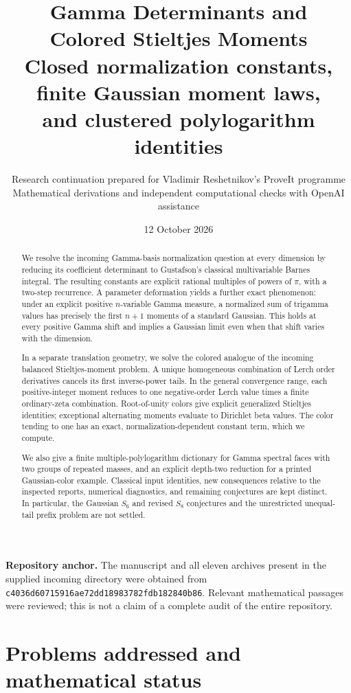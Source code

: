 \documentclass[11pt,a4paper]{article}
\title{\textbf{Gamma Determinants and\\Colored Stieltjes Moments}\\[7pt]
 \large Closed normalization constants, finite Gaussian moment laws,\\
 and clustered polylogarithm identities}
\author{Research continuation prepared for Vladimir Reshetnikov's ProveIt programme\\
 \small Mathematical derivations and independent computational checks with OpenAI assistance}
\date{12 October 2026}
\numberwithin{equation}{section}
\theoremstyle{definition}
\theoremstyle{remark}
\newcommand{\src}[1]{\nolinkurl{#1}}
\newcommand{\pin}{\src{c4036d60715916ae72dd18983782fdb182840b86}}
\begin{document}
\maketitle
\begin{abstract}
We resolve the incoming Gamma-basis normalization question at every
dimension by reducing its coefficient determinant to Gustafson's
classical multivariable Barnes integral. The resulting constants are
explicit rational multiples of powers of $\pi$, with a two-step
recurrence. A parameter deformation yields a further exact phenomenon:
under an explicit positive $n$-variable Gamma measure, a normalized sum
of trigamma values has precisely the first $n+1$ moments of a standard
Gaussian. This holds at every positive Gamma shift and implies a
Gaussian limit even when that shift varies with the dimension.

In a separate translation geometry, we solve the colored analogue of
the incoming balanced Stieltjes-moment problem. A unique homogeneous
combination of Lerch order derivatives cancels its first inverse-power
tails. In the general convergence range, each positive-integer moment reduces to one
negative-order Lerch value times a finite ordinary-zeta combination.
Root-of-unity colors give explicit generalized Stieltjes identities;
exceptional alternating moments evaluate to Dirichlet beta values.
The color tending to one has an exact, normalization-dependent
constant term, which we compute.

We also give a finite multiple-polylogarithm dictionary for Gamma
spectral faces with two groups of repeated masses, and an explicit
depth-two reduction for a printed Gaussian-color example.
Classical input identities, new consequences relative to the inspected
reports, numerical diagnostics, and remaining conjectures are kept
distinct. In particular, the Gaussian $S_6$ and revised $S_8$ conjectures
and the unrestricted unequal-tail prefix problem are not settled.
\end{abstract}
\vfill
{\noindent\small\textbf{Repository anchor.} The manuscript and all eleven
archives present in the supplied incoming directory were obtained from
\pin. Relevant mathematical passages were reviewed; this is not a
claim of a complete audit of the entire repository.\par}
\clearpage
{\small\tableofcontents}
\clearpage
\section{Problems addressed and mathematical status}
\label{sec:scope}
\end{document}
